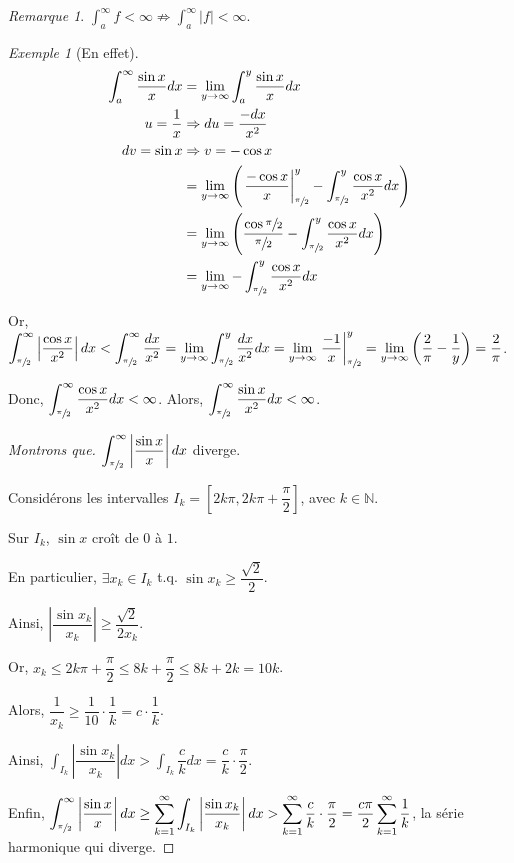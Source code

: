 \documentclass{report}
\newcommand*{\abs}[1]{\left| #1 \right|}
\newcommand*{\naturels}{\mathbb{N}}
\theoremstyle{definition}
\theoremstyle{remark}
\newtheorem*{exem}{Exemple}
\newtheorem*{rema}{Remarque}
\begin{document}
	\begin{rema}
		$\displaystyle\int_{a}^{\infty} f < \infty \not\Rightarrow \displaystyle\int_{a}^{\infty}\abs{f} < \infty$.
		\begin{exem}[En effet]
			\begin{align*}
				\int_{a}^{\infty}\dfrac{\sin x}{x} dx&= \lim_{y \to \infty}\int_{a}^{y}\dfrac{\sin x}{x} dx\\
				u=\frac{1}{x}&\Rightarrow du=\frac{-dx}{x^2}\\
				dv=\sin x&\Rightarrow v=-\cos x\\
				&= \lim_{y \to \infty}\left( \left. \dfrac{-\cos x}{x} \right|^y_{\sfrac{\pi}{2}} - \int_{\sfrac{\pi}{2}}^{y}\dfrac{\cos x}{x^2} dx \right)\\
				&= \lim_{y \to \infty}\left( \dfrac{\cos\sfrac{\pi}{2}}{\sfrac{\pi}{2}} - \int_{\sfrac{\pi}{2}}^y\dfrac{\cos x}{x^2} dx \right)\\
				&= \lim_{y \to \infty}-\int_{\sfrac{\pi}{2}}^{y} \dfrac{\cos x}{x^2} dx
			\end{align*}

			Or, $\displaystyle\int_{\sfrac{\pi}{2}}^\infty \abs{\dfrac{\cos x}{x^2}} dx < \displaystyle\int_{\sfrac{\pi}{2}}^\infty \dfrac{dx}{x^2} = \lim_{y \to \infty} \displaystyle\int_{\sfrac{\pi}{2}}^y \dfrac{dx}{x^2} dx = \lim_{y \to \infty}\left. \dfrac{-1}{x}\right|^y_{\sfrac{\pi}{2}} = \lim_{y \to \infty}\left( \dfrac{2}{\pi} - \dfrac{1}{y} \right) = \dfrac{2}{\pi}$.

			Donc, $\displaystyle\int_{\sfrac{\pi}{2}}^\infty \dfrac{\cos x}{x^2} dx < \infty$. Alors, $\displaystyle\int_{\sfrac{\pi}{2}}^\infty \dfrac{\sin x}{x^2} dx < \infty$.
			\begin{proof}[Montrons que]
				$\displaystyle\int_{\sfrac{\pi}{2}}^\infty \abs{\dfrac{\sin x}{x}} dx$ diverge.

				Consid\'erons les intervalles $I_k = \left[ 2k\pi, 2k\pi+\dfrac{\pi}{2} \right]$, avec $k \in \naturels$.

				Sur $I_k$, $\sin x$ cro\^it de $0$ \`a $1$.

				En particulier, $\exists x_k \in I_k$ t.q. $\sin x_k \geq \dfrac{\sqrt{2}}{2}$.

				Ainsi, $\abs{\dfrac{\sin x_k}{x_k}} \geq \dfrac{\sqrt{2}}{2x_k}$.

				Or, $x_k \leq 2k\pi+\dfrac{\pi}{2} \leq 8k+\dfrac{\pi}{2} \leq 8k+2k = 10k$.

				Alors, $\dfrac{1}{x_k} \geq \dfrac{1}{10} \cdot \dfrac{1}{k} = c \cdot \dfrac{1}{k}$.

				Ainsi, $\displaystyle\int_{I_k} \abs{\dfrac{\sin x_k}{x_k}} dx >  \displaystyle\int_{I_k} \dfrac{c}{k} dx = \dfrac{c}{k} \cdot \dfrac{\pi}{2}$.

				Enfin, $\displaystyle\int_{\sfrac{\pi}{2}}^\infty \abs{\dfrac{\sin x}{x}} dx \geq \displaystyle\sum_{k=1}^{\infty} \displaystyle\int_{I_k} \abs{\dfrac{\sin x_k}{x_k}} dx > \displaystyle\sum_{k=1}^\infty \dfrac{c}{k} \cdot \dfrac{\pi}{2} = \dfrac{c\pi}{2} \displaystyle\sum_{k=1}^\infty \dfrac{1}{k}$, la s\'erie harmonique qui diverge.
			\end{proof}
		\end{exem}
	\end{rema}
\end{document}
